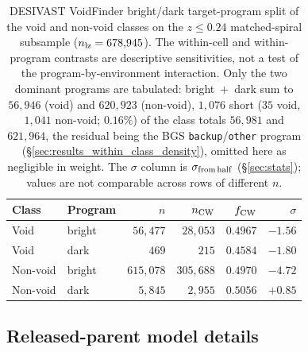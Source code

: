 \documentclass[twocolumn,linenumbers]{aastex702}
\begin{document}
\begin{table}[ht]
\caption{DESIVAST VoidFinder bright/dark target-program split of
the void and non-void classes on the $z \leq 0.24$ matched-spiral
subsample ($n_{\rm lz} = 678{,}945$). The within-cell and within-program
contrasts are descriptive sensitivities, not a test of the
program-by-environment interaction. Only the two dominant
programs are tabulated: bright~$+$~dark sum to $56{,}946$ (void) and
$620{,}923$ (non-void), $1{,}076$ short ($35$ void, $1{,}041$
non-void; $0.16\%$) of the class totals $56{,}981$ and $621{,}964$,
the residual being the BGS \texttt{backup}/\texttt{other} program
(\S\ref{sec:results_within_class_density}), omitted here as
negligible in weight. The $\sigma$ column
is $\sigma_{\rm from\,half}$ (\S\ref{sec:stats}); values are not
comparable across rows of different $n$.}
\label{tab:desivast_program_split}
\begin{ruledtabular}
\begin{tabular}{llrrrr}
Class & Program & $n$ & $n_{\rm CW}$ & $f_{\rm CW}$ & $\sigma$ \\
\hline
Void     & bright & $56{,}477$ & $28{,}053$ & $0.4967$ & $-1.56$ \\
Void     & dark   & $469$      & $215$      & $0.4584$ & $-1.80$ \\
Non-void & bright & $615{,}078$ & $305{,}688$ & $0.4970$ & $-4.72$ \\
Non-void & dark   & $5{,}845$  & $2{,}955$  & $0.5056$ & $+0.85$ \\
\end{tabular}
\end{ruledtabular}
\end{table}

\subsection{Released-parent model details}\label{sec:released_parent_primary}
\end{document}
